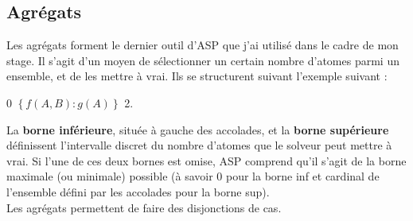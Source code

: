 \documentclass[12pt,a4paper]{article}
\begin{document}
\subsection{Agrégats}
Les agrégats forment le dernier outil d'ASP que j'ai utilisé dans le cadre de mon stage. Il s'agit d'un moyen de sélectionner un certain nombre d'atomes parmi un ensemble, et de les mettre à vrai. Ils se 
structurent suivant l'exemple suivant :
\begin{center}
  0 $\left\{ f(A,B):g(A)\right\}$ 2.
\end{center}
La \textbf{borne inférieure}, située à gauche des accolades, et la \textbf{borne supérieure} définissent l'intervalle discret du nombre d'atomes que le solveur peut mettre à vrai. Si l'une de ces deux bornes est omise, 
ASP comprend qu'il s'agit de la borne maximale (ou minimale) possible (à savoir 0 pour la borne inf et cardinal de l'ensemble défini par les accolades pour la borne sup).\\
Les agrégats permettent de faire des disjonctions de cas.
\end{document}
